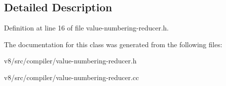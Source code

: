 \subsection{Detailed Description}


Definition at line 16 of file value-\/numbering-\/reducer.\+h.



The documentation for this class was generated from the following files\+:\begin{DoxyCompactItemize}
\item 
v8/src/compiler/value-\/numbering-\/reducer.\+h\item 
v8/src/compiler/value-\/numbering-\/reducer.\+cc\end{DoxyCompactItemize}
